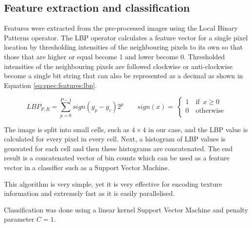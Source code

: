 \subsection{Feature extraction and classification}
Features were extracted from the pre-processed images using the Local Binary
Patterns operator. The LBP operator calculates a feature vector for a single
pixel location by thresholding intensities of the neighbouring pixels to its
own so that those that are higher or equal become 1 and lower become 0.
Thresholded intensities of the neighbouring pixels are followed clockwise or
anti-clockwise become a single bit string that can also be represented as a
decimal as shown in Equation \ref{eq:spec:features:lbp}.

\begin{equation}
\label{eq:spec:features:lbp}
LBP_{P,R} = \sum_{p=0}^{P-1} sign(g_p - g_c)2^p  \qquad sign(x) = \
\begin{cases}
    1 \quad \text{if} \enspace x \geq 0 \\
    0 \quad \text{otherwise} \\
\end{cases}
\end{equation}

The image is split into small cells, such as $4 \times 4$ in our case, and the
LBP value is calculated for every pixel in every cell. Next, a histogram of LBP
values is generated for each cell and then these histograms are concatenated.
The end result is a concatenated vector of bin counts which can be used as a
feature vector in a classifier such as a Support Vector Machine.

This algorithm is very simple, yet it is very effective for encoding texture
information and extremely fast as it is easily parallelised.

Classification was done using a linear kernel Support Vector Machine and
penalty parameter $C = 1$.


